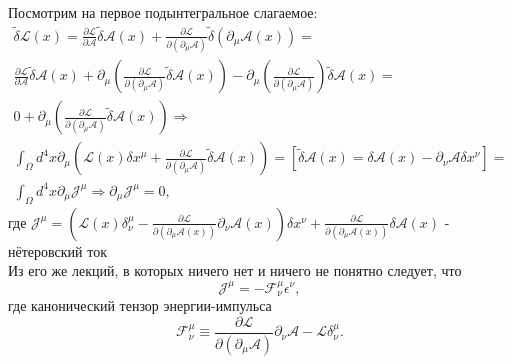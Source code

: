 	 Посмотрим на первое подынтегральное слагаемое:
	 \begin{gather*}
	 \tilde{\delta}\mathcal{L}(x)=
	 \frac{\partial \mathcal{L}}{\partial \mathcal{A}}\tilde{\delta}\mathcal{A}(x)+
	 \frac{\partial \mathcal{L}}{\partial (\partial_\mu\mathcal{A})}\tilde{\delta}(\partial_\mu\mathcal{A}(x))=\\
	 \frac{\partial \mathcal{L}}{\partial \mathcal{A}}\tilde{\delta}\mathcal{A}(x)+
	 \partial_\mu\left(\frac{\partial \mathcal{L}}{\partial (\partial_\mu\mathcal{A})}\tilde{\delta}\mathcal{A}(x)\right)-
	 \partial_\mu\left(\frac{\partial \mathcal{L}}{\partial (\partial_\mu\mathcal{A})}\right)\tilde{\delta}\mathcal{A}(x)=\\
	 0+ \partial_\mu\left(\frac{\partial \mathcal{L}}{\partial (\partial_\mu\mathcal{A})}\tilde{\delta}\mathcal{A}(x)\right)\Rightarrow\\
	 \int_\Omega d^4x\partial_\mu\left(\mathcal{L}(x)\delta x^\mu+\frac{\partial \mathcal{L}}{\partial (\partial_\mu\mathcal{A})}\tilde{\delta}\mathcal{A}(x)\right)=
	 \left[\tilde{\delta}\mathcal{A}(x)=\delta\mathcal{A}(x)-\partial_\nu\mathcal{A}\delta x^\nu\right]=\\
	 \int_\Omega d^4x\partial_\mu\mathcal{J}^\mu\Rightarrow
	 \partial_\mu\mathcal{J}^\mu=0,
	 \end{gather*}
	 где $\mathcal{J}^\mu=\left(\mathcal{L}(x)\delta_\nu^\mu-\frac{\partial \mathcal{L}}{\partial (\partial_\mu\mathcal{A}(x))}\partial_\nu\mathcal{A}(x)\right)\delta x^\nu+\frac{\partial\mathcal{L}}{\partial(\partial_\mu\mathcal{A}(x))}\delta\mathcal{A}(x)$ - нётеровский ток\\
	 
	 Из его же лекций, в которых ничего нет и ничего не понятно следует, что 
	 $$
	 \mathcal{J}^\mu=-\mathcal{F}_\nu^\mu\epsilon^\nu,
	 $$
	 где канонический тензор энергии-импульса
	 $$
	 \mathcal{F}_\nu^\mu\equiv\frac{\partial \mathcal{L}}{\partial (\partial_\mu \mathcal{A})}\partial_\nu\mathcal{A}-\mathcal{L}\delta_\nu^\mu.
	 $$
